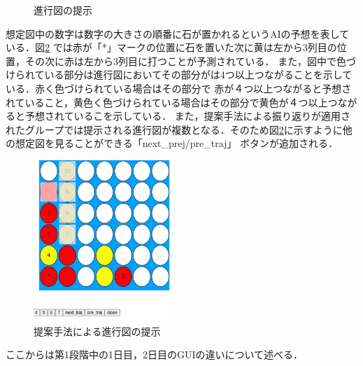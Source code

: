 \begin{figure}[htbp]
    \centering
    \setlength{\fboxsep}{1pt} %
    \setlength{\fboxrule}{1pt} %
    \caption{進行図の提示}
	\label{fig:number-button}
\end{figure}
想定図中の数字は数字の大きさの順番に石が置かれるというAIの予想を表している．図\ref{fig:multi}
では赤が「*」マークの位置に石を置いた次に黄は左から3列目の位置，その次に赤は左から3列目に打つことが予測されている．
また，図中で色づけられている部分は進行図においてその部分がは4つ以上つながることを示している．赤く色づけられている場合はその部分で
赤が４つ以上つながると予想されていること，黄色く色づけられている場合はその部分で黄色が４つ以上つながると予想されているこを示している．
また，提案手法による振り返りが適用されたグループでは提示される進行図が複数となる．そのため図\ref{fig:multi}に示すように他の想定図を見ることができる「next\_prej/pre\_traj」
ボタンが追加される．
\begin{figure}[htbp]
	\centering
	\includegraphics[width=150pt]{./figure/multi.png}
	\caption{提案手法による進行図の提示}
	\label{fig:multi}
\end{figure}
ここからは第1段階中の1日目，2日目のGUIの違いについて述べる．
